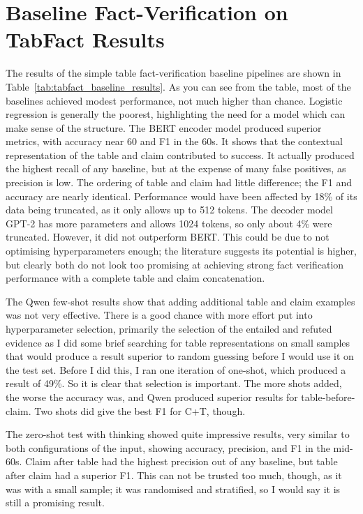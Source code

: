 \section{Baseline Fact-Verification on TabFact Results}
The results of the simple table fact-verification baseline pipelines are shown in Table~\ref{tab:tabfact_baseline_results}. As you can see from the table, most of the baselines achieved modest performance, not much higher than chance. Logistic regression is generally the poorest, highlighting the need for a model which can make sense of the structure. The BERT encoder model produced superior metrics, with accuracy near 60 and F1 in the 60s. It shows that the contextual representation of the table and claim contributed to success. It actually produced the highest recall of any baseline, but at the expense of many false positives, as precision is low. The ordering of table and claim had little difference; the F1 and accuracy are nearly identical. Performance would have been affected by 18\% of its data being truncated, as it only allows up to 512 tokens. The decoder model GPT-2 has more parameters and allows 1024 tokens, so only about 4\% were truncated. However, it did not outperform BERT. This could be due to not optimising hyperparameters enough; the literature suggests its potential is higher, but clearly both do not look too promising at achieving strong fact verification performance with a complete table and claim concatenation. 



\vspace{\baselineskip}
\noindent The Qwen few-shot results show that adding additional table and claim examples was not very effective. There is a good chance with more effort put into hyperparameter selection, primarily the selection of the entailed and refuted evidence as I did some brief searching for table representations on small samples that would produce a result superior to random guessing before I would use it on the test set. Before I did this, I ran one iteration of one-shot, which produced a result of 49\%. So it is clear that selection is important. The more shots added, the worse the accuracy was, and Qwen produced superior results for table-before-claim. Two shots did give the best F1 for C+T, though. 

\vspace{\baselineskip}
\noindent The zero-shot test with thinking showed quite impressive results, very similar to both configurations of the input, showing accuracy, precision, and F1 in the mid-60s. Claim after table had the highest precision out of any baseline, but table after claim had a superior F1. This can not be trusted too much, though, as it was with a small sample; it was randomised and stratified, so I would say it is still a promising result. 


